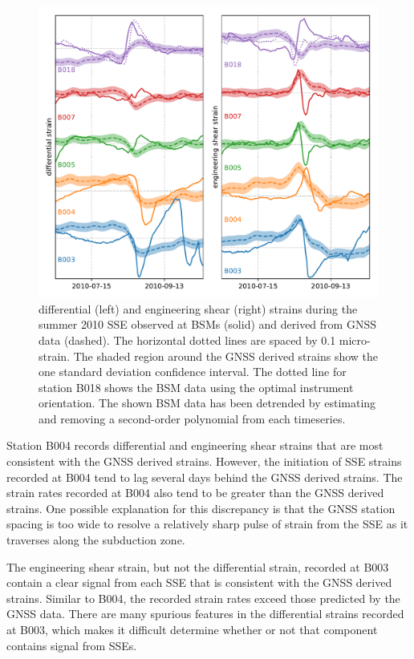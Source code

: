 \begin{figure}
\includegraphics{ch5/appendix_figures/SSE1.pdf}
\caption{differential (left) and engineering shear (right) strains
during the summer 2010 SSE observed at BSMs (solid) and derived from
GNSS data (dashed). The horizontal dotted lines are spaced by 0.1
micro-strain. The shaded region around the GNSS derived strains show
the one standard deviation confidence interval. The dotted line for
station B018 shows the BSM data using the optimal instrument
orientation. The shown BSM data has been detrended by estimating and
removing a second-order polynomial from each timeseries.}
\label{fig:SSE1}
\end{figure}

Station B004 records differential and engineering shear strains that
are most consistent with the GNSS derived strains. However, the
initiation of SSE strains recorded at B004 tend to lag several days
behind the GNSS derived strains. The strain rates recorded at B004
also tend to be greater than the GNSS derived strains. One possible
explanation for this discrepancy is that the GNSS station spacing is
too wide to resolve a relatively sharp pulse of strain from the SSE as
it traverses along the subduction zone.

The engineering shear strain, but not the differential strain,
recorded at B003 contain a clear signal from each SSE that is
consistent with the GNSS derived strains. Similar to B004, the
recorded strain rates exceed those predicted by the GNSS data. There
are many spurious features in the differential strains recorded at
B003, which makes it difficult determine whether or not that component
contains signal from SSEs.

